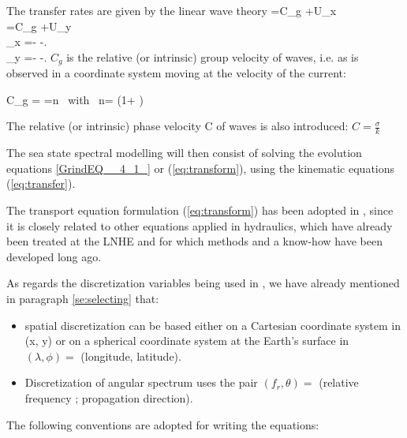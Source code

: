 The transfer rates are given by the linear wave theory \cite{Chaloin1989}
\cite{Komen1994} \cite{Mei1983} \cite{Tolman1991}
\bequ
\label{eq:transfer}
\dsp
{}=C_g  +U_x \\[6pt]
\dsp
{}=C_g  +U_y \\[6pt]
\dsp
{}_x =- 
-. \\[6pt]
\dsp
{}_y =- 
-.
\earr 
\eequ
$C_g$ is the relative (or intrinsic) group velocity of waves, i.e. as is
observed in a coordinate system moving at the velocity of the current:

\bequ
\label{eq:cg4_8}
C_g = =n \mbox{ with }
n= \left(1+ \right)
\eequ

The relative (or intrinsic) phase velocity C of waves is also introduced:
$C=\frac{\sigma }{k} $

The sea state spectral modelling will then consist of solving the evolution
equations \eqref{GrindEQ__4_1_} or (\ref{eq:transform}), using the kinematic
equations (\ref{eq:transfer}).

The transport equation formulation (\ref{eq:transform}) has been adopted in
\tomawac, since it is closely related to other equations applied in hydraulics,
which have already been treated at the LNHE and for which methods and a
know-how have been developed long ago.

As regards the discretization variables being used in \tomawac, we have
already mentioned in paragraph \ref{se:selecting} that:

 \begin{itemize}
 \item spatial discretization can be based either on a Cartesian coordinate
   system in (x, y) or on a spherical coordinate system at the Earth's surface
   in $(\lambda, \phi) =$ (longitude, latitude).
 \item Discretization of angular spectrum uses the pair $(f_r, \theta) =$
   (relative frequency ; propagation direction).
\end{itemize}

 The following conventions are adopted for writing the equations:

